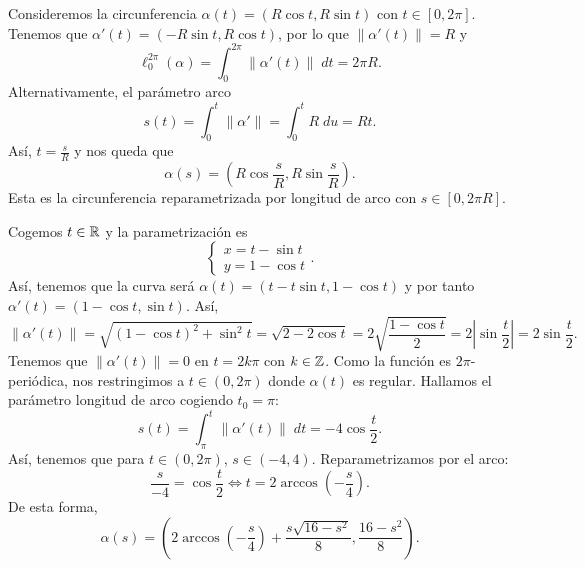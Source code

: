 \begin{eg}
	Consideremos la circunferencia $\displaystyle \alpha\left(t\right)=\left(R \cos t, R \sin t\right) $ con $\displaystyle t \in \left[0, 2\pi \right]  $. Tenemos que $\displaystyle \alpha'\left(t\right)=\left(-R\sin t, R \cos t\right) $, por lo que $\displaystyle \|\alpha'\left(t\right)\| = R $ y 
	\[\ell^{2\pi }_{0}\left(\alpha \right)=\int^{2\pi }_{0} \|\alpha'\left(t\right)\| \; dt = 2\pi R .\]
Alternativamente, el parámetro arco
\[s\left(t\right)=\int^{t}_{0} \|\alpha'\| = \int^{t}_{0} R \; d u = Rt .\]
Así, $\displaystyle t = \frac{s}{R} $ y nos queda que 
\[\alpha\left(s\right)=\left(R\cos \frac{s}{R}, R\sin \frac{s}{R}\right) .\]
Esta es la circunferencia reparametrizada por longitud de arco con $\displaystyle s \in \left[0, 2\pi R\right]  $. 
\end{eg}
\begin{eg}[Cicloide]
Cogemos $\displaystyle t \in \mathbb{R} $ y la parametrización es
\[
\begin{cases}
x = t - \sin t \\
y = 1- \cos t
\end{cases}
.\]
Así, tenemos que la curva será $\displaystyle \alpha\left(t\right)=\left(t-t\sin t, 1-\cos t\right) $ y por tanto $\displaystyle \alpha'\left(t\right)=\left(1-\cos t, \sin t\right) $. Así, 
\[\|\alpha'\left(t\right)\| = \sqrt{\left(1-\cos t\right)^{2}+ \sin ^{2}t} = \sqrt{2 - 2 \cos t} =2\sqrt{\frac{1-\cos t}{2}} = 2 \left|\sin \frac{t}{2}\right| = 2\sin \frac{t}{2}.\]
Tenemos que $\displaystyle \|\alpha'\left(t\right)\| = 0 $ en $\displaystyle t = 2k\pi  $ con $\displaystyle k \in \mathbb{Z} $. Como la función es $\displaystyle 2\pi  $-periódica, nos restringimos a $\displaystyle t \in \left(0,2\pi \right) $ donde $\displaystyle \alpha\left(t\right) $ es regular. Hallamos el parámetro longitud de arco cogiendo $\displaystyle t_{0} = \pi  $:
\[s\left(t\right)=\int^{t}_{\pi} \|\alpha'\left(t\right)\| \; dt = -4\cos \frac{t}{2} .\]
Así, tenemos que para $\displaystyle t \in \left(0,2\pi \right) $, $\displaystyle s \in \left(-4,4\right) $.
Reparametrizamos por el arco:
\[\frac{s}{-4}= \cos\frac{t}{2} \iff t = 2\arccos\left(-\frac{s}{4}\right) .\]
De esta forma, 
\[\alpha\left(s\right)=\left(2\arccos\left(-\frac{s}{4}\right)+\frac{s\sqrt{16-s^{2}}}{8}, \frac{16- s^{2}}{8}\right) .\]
\end{eg}

